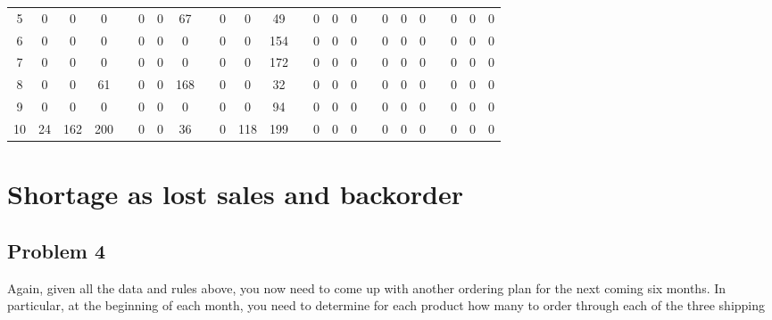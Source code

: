 \documentclass[12pt,a4paper]{article}
\begin{document}
\begin{table}[]
{\begin{tabular}{cccclllcccccllcccclccccl}
5       & 0      & 0       & 0      &  & 0                      & 0                      & 67  &                      & 0     & 0      & 49     &  & 0                      & 0  & 0  &                      & 0  & 0                      & 0  &                      & 0  & 0  & 0                      \\
6       & 0      & 0       & 0      &  & 0                      & 0                      & 0   &                      & 0     & 0      & 154    &  & 0                      & 0  & 0  &                      & 0  & 0                      & 0  &                      & 0  & 0  & 0                      \\
7       & 0      & 0       & 0      &  & 0                      & 0                      & 0   &                      & 0     & 0      & 172    &  & 0                      & 0  & 0  &                      & 0  & 0                      & 0  &                      & 0  & 0  & 0                      \\
8       & 0      & 0       & 61     &  & 0                      & 0                      & 168 &                      & 0     & 0      & 32     &  & 0                      & 0  & 0  &                      & 0  & 0                      & 0  &                      & 0  & 0  & 0                      \\
9       & 0      & 0       & 0      &  & 0                      & 0                      & 0   &                      & 0     & 0      & 94     &  & 0                      & 0  & 0  &                      & 0  & 0                      & 0  &                      & 0  & 0  & 0                      \\
10      & 24     & 162     & 200    &  & 0                      & 0                      & 36  &                      & 0     & 118    & 199    &  & 0                      & 0  & 0  &                      & 0  & 0                      & 0  &                      & 0  & 0  & 0                      \\ \hline
\end{tabular}}
\end{table}


\section{Shortage as lost sales and backorder}
\subsection*{Problem 4}
Again, given all the data and rules above, you now need to come up with another ordering
plan for the next coming six months. In particular, at the beginning of each month, you
need to determine for each product how many to order through each of the three shipping\\
\end{document}
